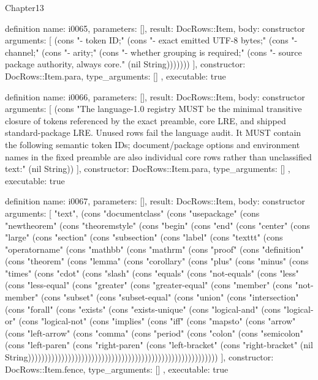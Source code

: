 \begin{lexlean}{Chapter13}
\begin{semanticmodule}
definition{
  name: i0065,
  parameters: [],
  result: DocRows::Item,
  body: constructor{
    arguments: [
      (cons "- token ID;" (cons "- exact emitted UTF-8 bytes;" (cons "- channel;" (cons "- arity;" (cons "- whether grouping is required;" (cons "- source package authority, always core." (nil String)))))))
    ],
    constructor: DocRows::Item.para,
    type_arguments: []
  },
  executable: true
}

definition{
  name: i0066,
  parameters: [],
  result: DocRows::Item,
  body: constructor{
    arguments: [
      (cons "The language-1.0 registry MUST be the minimal transitive closure of tokens referenced by the exact preamble, core LRE, and shipped standard-package LRE. Unused rows fail the language audit. It MUST contain the following semantic token IDs; document/package options and environment names in the fixed preamble are also individual core rows rather than unclassified text:" (nil String))
    ],
    constructor: DocRows::Item.para,
    type_arguments: []
  },
  executable: true
}

definition{
  name: i0067,
  parameters: [],
  result: DocRows::Item,
  body: constructor{
    arguments: [
      "text",
      (cons "documentclass" (cons "usepackage" (cons "newtheorem" (cons "theoremstyle" (cons "begin" (cons "end" (cons "center" (cons "large" (cons "section" (cons "subsection" (cons "label" (cons "texttt" (cons "operatorname" (cons "mathbb" (cons "mathrm" (cons "proof" (cons "definition" (cons "theorem" (cons "lemma" (cons "corollary" (cons "plus" (cons "minus" (cons "times" (cons "cdot" (cons "slash" (cons "equals" (cons "not-equals" (cons "less" (cons "less-equal" (cons "greater" (cons "greater-equal" (cons "member" (cons "not-member" (cons "subset" (cons "subset-equal" (cons "union" (cons "intersection" (cons "forall" (cons "exists" (cons "exists-unique" (cons "logical-and" (cons "logical-or" (cons "logical-not" (cons "implies" (cons "iff" (cons "mapsto" (cons "arrow" (cons "left-arrow" (cons "comma" (cons "period" (cons "colon" (cons "semicolon" (cons "left-paren" (cons "right-paren" (cons "left-bracket" (cons "right-bracket" (nil String)))))))))))))))))))))))))))))))))))))))))))))))))))))))))
    ],
    constructor: DocRows::Item.fence,
    type_arguments: []
  },
  executable: true
}


\end{semanticmodule}
\end{lexlean}
